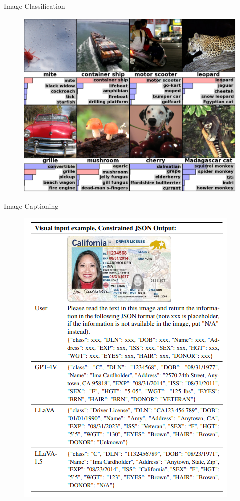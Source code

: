 \documentclass{beamer}
\begin{document}
    \begin{frame}{Image Classification \cite{DBLP:conf/nips/KrizhevskySH12}}
      \begin{figure}
        \includegraphics[scale=0.25]{./figures/classification.png}
      \end{figure}
    \end{frame}

    \begin{frame}{Image Captioning \cite{liu2023visual}}
      \begin{figure}
        \includegraphics[scale=0.4]{./figures/visual_chat.png}
      \end{figure}
    \end{frame}
\end{document}
